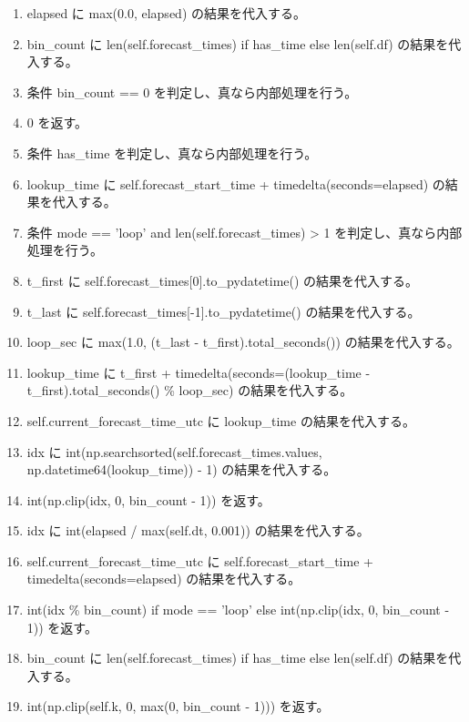 \documentclass[a4paper,11pt]{article}
\begin{document}
\begin{enumerate}[leftmargin=1.8em]
\item   elapsed に max(0.0, elapsed) の結果を代入する。
\item   bin\_count に len(self.forecast\_times) if has\_time else len(self.df) の結果を代入する。
\item   条件 bin\_count == 0 を判定し、真なら内部処理を行う。
\item     0 を返す。
\item   条件 has\_time を判定し、真なら内部処理を行う。
\item     lookup\_time に self.forecast\_start\_time + timedelta(seconds=elapsed) の結果を代入する。
\item     条件 mode == 'loop' and len(self.forecast\_times) > 1 を判定し、真なら内部処理を行う。
\item       t\_first に self.forecast\_times[0].to\_pydatetime() の結果を代入する。
\item       t\_last に self.forecast\_times[-1].to\_pydatetime() の結果を代入する。
\item       loop\_sec に max(1.0, (t\_last - t\_first).total\_seconds()) の結果を代入する。
\item       lookup\_time に t\_first + timedelta(seconds=(lookup\_time - t\_first).total\_seconds() \% loop\_sec) の結果を代入する。
\item     self.current\_forecast\_time\_utc に lookup\_time の結果を代入する。
\item     idx に int(np.searchsorted(self.forecast\_times.values, np.datetime64(lookup\_time)) - 1) の結果を代入する。
\item     int(np.clip(idx, 0, bin\_count - 1)) を返す。
\item   idx に int(elapsed / max(self.dt, 0.001)) の結果を代入する。
\item   self.current\_forecast\_time\_utc に self.forecast\_start\_time + timedelta(seconds=elapsed) の結果を代入する。
\item   int(idx \% bin\_count) if mode == 'loop' else int(np.clip(idx, 0, bin\_count - 1)) を返す。
\item bin\_count に len(self.forecast\_times) if has\_time else len(self.df) の結果を代入する。
\item int(np.clip(self.k, 0, max(0, bin\_count - 1))) を返す。
            \end{enumerate}
\end{document}

